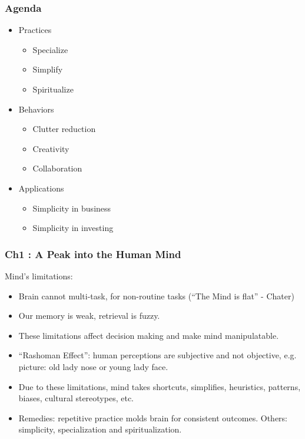 \begin{frame}[fragile]\frametitle{Agenda}

\begin{itemize}
\item Practices
	\begin{itemize}
	\item Specialize
	\item Simplify
	\item Spiritualize
	\end{itemize}

\item Behaviors
	\begin{itemize}
	\item Clutter reduction
	\item Creativity
	\item Collaboration
	\end{itemize}
	
\item Applications
	\begin{itemize}
	\item Simplicity in business
	\item Simplicity in investing
	\end{itemize}	
\end{itemize}

\end{frame}

\begin{frame}[fragile]\frametitle{Ch1 : A Peak into the Human Mind}
Mind's limitations:
\begin{itemize}
\item Brain cannot multi-task, for non-routine tasks (``The Mind is flat'' - Chater)
\item Our memory is weak, retrieval is fuzzy.
\item These limitations affect decision making and make mind manipulatable.
\item ``Rashoman Effect'': human perceptions are subjective and not objective, e.g. picture: old lady nose or young lady face.
\item Due to these limitations, mind takes shortcuts, simplifies, heuristics, patterns, biases, cultural stereotypes, etc.
\item Remedies: repetitive practice molds brain for consistent outcomes. Others: simplicity, specialization and spiritualization.
\end{itemize}

\end{frame}

